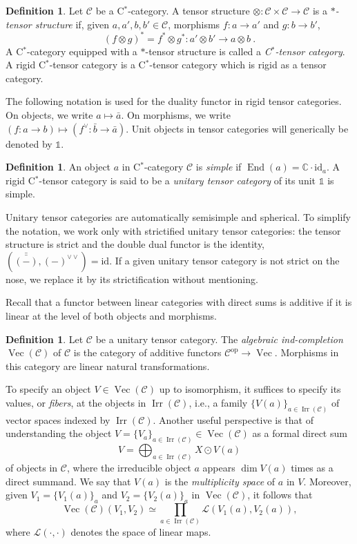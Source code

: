 \documentclass[a4paper,11pt,reqno]{amsart}
\numberwithin{equation}{section}
\theoremstyle{remark}
\theoremstyle{definition}
\newtheorem{definition}[theorem]{Definition}
\newcommand{\C}{\mathbb C}
\newcommand{\cC}{\mathcal C}
\newcommand{\cL}{\mathcal L}
\DeclareMathOperator{\End}{End}
\DeclareMathOperator{\Irr}{Irr}
\DeclareMathOperator{\Vect}{Vec}
\newcommand\op{\text{op}}
\newcommand\un{{\mathds 1}}
\newcommand{\id}{\mathrm{id}}
\begin{document}
\begin{definition}
	Let $\cC$ be a C$^*$-category. A tensor structure $\otimes:
	\cC \times \cC \to \cC$ is a {\em $*$-tensor structure} if, given $a,a',b,b' \in \cC$, morphisms $f: a \to a'$ and $g: b \to b'$, 
	\[
	(f \otimes g)^* = f^* \otimes g^* : a' \otimes b' \to a \otimes b \ .
	\]
	A C$^*$-category equipped with a $*$-tensor structure is called a {\em C$^*$-tensor category}. A rigid C$^*$-tensor category is a C$^*$-tensor category which is rigid as a tensor category.
	\label{def:C*tensorstructure}
\end{definition}

The following notation is used for the duality functor in rigid tensor categories. On objects, we write $a \mapsto \bar{a}$. On morphisms, we write $(f:a \to b) \mapsto (f^\vee: \bar{b} \to \bar{a})$. Unit objects in tensor categories will generically be denoted by $\un$.

\begin{definition}
	An object $a$ in C$^*$-category $\cC$ is {\em simple} if $\End(a) = \C \cdot \id_a$. A rigid C$^*$-tensor category is said to be a {\em unitary tensor category} of its unit $\un$ is simple.
	\label{def:unitarytensorcategories}
\end{definition}

Unitary tensor categories are automatically semisimple and spherical. To simplify the notation, we work only with strictified unitary tensor categories: the tensor structure is strict and the double dual functor is the identity, $(\bar{\bar{(-)}}, (-)^{\vee \vee}) = \id$. If  a given unitary tensor category is not strict on the nose, we replace it by its strictification without mentioning.

Recall that a functor between linear categories with direct sums is additive if it is linear at the level of both objects and morphisms.

\begin{definition}
	Let $\cC$ be a unitary tensor category. The {\em algebraic ind-completion} $\Vect(\cC)$ of $\cC$ is the category of additive functors $\cC^{\op} \to \Vect$. Morphisms in this category are linear natural transformations.
\end{definition}

To specify an object $V \in \Vect(\cC)$ up to isomorphism, it suffices to specify its values, or {\em fibers}, at the objects in $\Irr(\cC)$, i.e., a family $\{V(a)\}_{a \in \Irr(\cC)}$ of vector spaces indexed by $\Irr(\cC)$. Another useful perspective is that of understanding the object $V = \{V_a\}_{a \in \Irr(\cC)} \in \Vect(\cC)$ as a  formal direct sum
\[ V = \bigoplus_{a \in \Irr(\cC)} X \odot V(a) \]
of objects in $\cC$, where the irreducible object $a$ appears $\dim V(a)$ times as a direct summand. We say that $V(a)$ is the {\em multiplicity space} of $a$ in $V$. Moreover, given $V_1 = \{V_1(a)\}_a$ and $V_2=\{V_2(a)\}_a$ in $\Vect(\cC)$, it follows that
\[ \Vect(\cC)(V_1,V_2) \simeq \prod_{a \in \Irr(\cC)} \cL(V_1(a),V_2(a)) , \]
where $\cL(\cdot,\cdot)$ denotes the space of linear maps.
\end{document}
